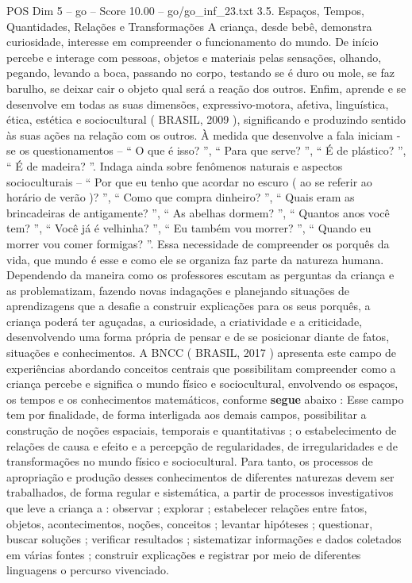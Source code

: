 \begin{textsample}{POS Dim 5 – go – Score 10.00 – go/go\_inf\_23.txt}  \label{ex:f5_pos_004}
3.5.
Espaços, Tempos, Quantidades, Relações e Transformações A criança, desde bebê, demonstra curiosidade, interesse em compreender o funcionamento do mundo.
De início percebe e interage com pessoas, objetos e materiais pelas sensações, olhando, pegando, levando a boca, passando no corpo, testando se é duro ou mole, se faz barulho, se deixar cair o objeto qual será a reação dos outros.
Enfim, aprende e se desenvolve em todas as suas dimensões, expressivo-motora, afetiva, linguística, ética, estética e sociocultural ( BRASIL, 2009 ), significando e produzindo sentido às suas ações na relação com os outros.
À medida que desenvolve a fala iniciam -se os questionamentos – “ O que é isso? ”, “ Para que serve? ”, “ É de plástico? ”, “ É de madeira? ”.
Indaga ainda sobre fenômenos naturais e aspectos socioculturais – “ Por que eu tenho que acordar no escuro ( ao se referir ao horário de verão )? ”, “ Como que compra dinheiro? ”, “ Quais eram as brincadeiras de antigamente? ”, “ As abelhas dormem? ”, “ Quantos anos você tem? ”, “ Você já é velhinha? ”, “ Eu também vou morrer? ”, “ Quando eu morrer vou comer formigas? ”.
Essa necessidade de compreender os porquês da vida, que mundo é esse e como ele se organiza faz parte da natureza humana.
Dependendo da maneira como os professores escutam as perguntas da criança e as problematizam, fazendo novas indagações e planejando situações de aprendizagens que a desafie a construir explicações para os seus porquês, a criança poderá ter aguçadas, a curiosidade, a criatividade e a criticidade, desenvolvendo uma forma própria de pensar e de se posicionar diante de fatos, situações e conhecimentos.
A BNCC ( BRASIL, 2017 ) apresenta este campo de experiências abordando conceitos centrais que possibilitam compreender como a criança percebe e significa o mundo físico e sociocultural, envolvendo os espaços, os tempos e os conhecimentos matemáticos, conforme \textbf{segue} abaixo : Esse campo tem por finalidade, de forma interligada aos demais campos, possibilitar a construção de noções espaciais, temporais e quantitativas ; o estabelecimento de relações de causa e efeito e a percepção de regularidades, de irregularidades e de transformações no mundo físico e sociocultural.
Para tanto, os processos de apropriação e produção desses conhecimentos de diferentes naturezas devem ser trabalhados, de forma regular e sistemática, a partir de processos investigativos que leve a criança a : observar ; explorar ; estabelecer relações entre fatos, objetos, acontecimentos, noções, conceitos ; levantar hipóteses ; questionar, buscar soluções ; verificar resultados ; sistematizar informações e dados coletados em várias fontes ; construir explicações e registrar por meio de diferentes linguagens o percurso vivenciado.

\end{textsample}
